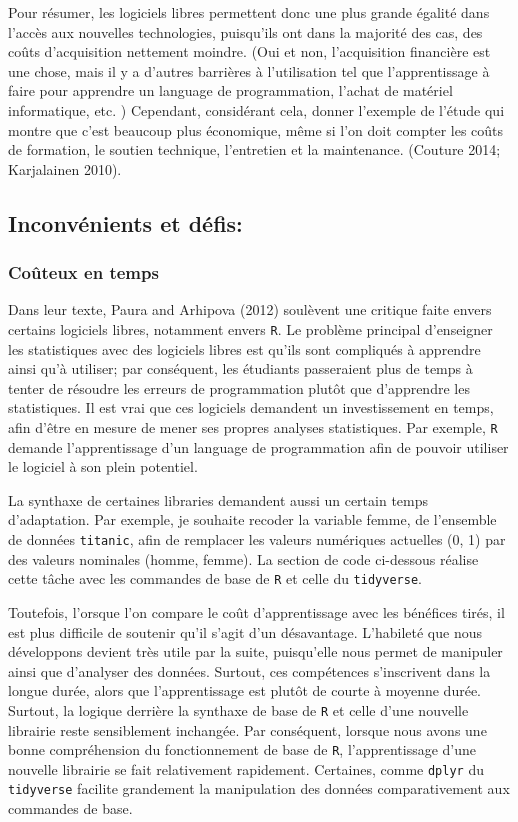 \documentclass[
  letterpaper,
]{scrbook}
\begin{document}
Pour résumer, les logiciels libres permettent donc une plus grande
égalité dans l'accès aux nouvelles technologies, puisqu'ils ont dans la
majorité des cas, des coûts d'acquisition nettement moindre. (Oui et
non, l'acquisition financière est une chose, mais il y a d'autres
barrières à l'utilisation tel que l'apprentissage à faire pour apprendre
un language de programmation, l'achat de matériel informatique, etc. )
Cependant, considérant cela, donner l'exemple de l'étude qui montre que
c'est beaucoup plus économique, même si l'on doit compter les coûts de
formation, le soutien technique, l'entretien et la maintenance. (Couture
2014; Karjalainen 2010).

\hypertarget{inconvuxe9nients-et-duxe9fis}{%
\subsection{Inconvénients et
défis:}\label{inconvuxe9nients-et-duxe9fis}}

\hypertarget{couxfbteux-en-temps}{%
\subsubsection{Coûteux en temps}\label{couxfbteux-en-temps}}

Dans leur texte, Paura and Arhipova (2012) soulèvent une critique faite
envers certains logiciels libres, notamment envers \texttt{R}. Le
problème principal d'enseigner les statistiques avec des logiciels
libres est qu'ils sont compliqués à apprendre ainsi qu'à utiliser; par
conséquent, les étudiants passeraient plus de temps à tenter de résoudre
les erreurs de programmation plutôt que d'apprendre les statistiques. Il
est vrai que ces logiciels demandent un investissement en temps, afin
d'être en mesure de mener ses propres analyses statistiques. Par
exemple, \texttt{R} demande l'apprentissage d'un language de
programmation afin de pouvoir utiliser le logiciel à son plein
potentiel.

La synthaxe de certaines libraries demandent aussi un certain temps
d'adaptation. Par exemple, je souhaite recoder la variable femme, de
l'ensemble de données \texttt{titanic}, afin de remplacer les valeurs
numériques actuelles (0, 1) par des valeurs nominales (homme, femme). La
section de code ci-dessous réalise cette tâche avec les commandes de
base de \texttt{R} et celle du \texttt{tidyverse}.

Toutefois, l'orsque l'on compare le coût d'apprentissage avec les
bénéfices tirés, il est plus difficile de soutenir qu'il s'agit d'un
désavantage. L'habileté que nous développons devient très utile par la
suite, puisqu'elle nous permet de manipuler ainsi que d'analyser des
données. Surtout, ces compétences s'inscrivent dans la longue durée,
alors que l'apprentissage est plutôt de courte à moyenne durée. Surtout,
la logique derrière la synthaxe de base de \texttt{R} et celle d'une
nouvelle librairie reste sensiblement inchangée. Par conséquent, lorsque
nous avons une bonne compréhension du fonctionnement de base de
\texttt{R}, l'apprentissage d'une nouvelle librairie se fait
relativement rapidement. Certaines, comme \texttt{dplyr} du
\texttt{tidyverse} facilite grandement la manipulation des données
comparativement aux commandes de base.
\end{document}
